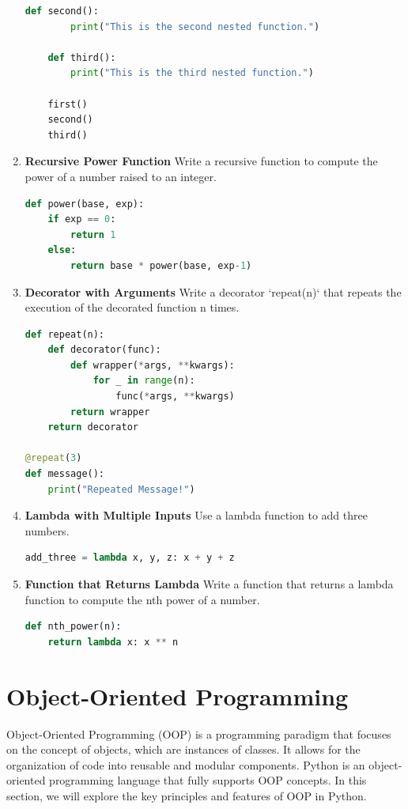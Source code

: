 \documentclass[12pt]{book}
\begin{document}
\begin{enumerate}
\begin{lstlisting}[language=Python]
    def second():
        print("This is the second nested function.")

    def third():
        print("This is the third nested function.")

    first()
    second()
    third()
\end{lstlisting}

\item \textbf{Recursive Power Function}
Write a recursive function to compute the power of a number raised to an integer.


\begin{lstlisting}[language=Python]
def power(base, exp):
    if exp == 0:
        return 1
    else:
        return base * power(base, exp-1)
\end{lstlisting}

\item \textbf{Decorator with Arguments}
Write a decorator `repeat(n)` that repeats the execution of the decorated function n times.


\begin{lstlisting}[language=Python]
def repeat(n):
    def decorator(func):
        def wrapper(*args, **kwargs):
            for _ in range(n):
                func(*args, **kwargs)
        return wrapper
    return decorator

@repeat(3)
def message():
    print("Repeated Message!")
\end{lstlisting}

\item \textbf{Lambda with Multiple Inputs}
Use a lambda function to add three numbers.


\begin{lstlisting}[language=Python]
add_three = lambda x, y, z: x + y + z
\end{lstlisting}

\item \textbf{Function that Returns Lambda}
Write a function that returns a lambda function to compute the nth power of a number.


\begin{lstlisting}[language=Python]
def nth_power(n):
    return lambda x: x ** n
\end{lstlisting}
\end{enumerate}


\newpage
\newpage
\chapter{Object-Oriented Programming}
Object-Oriented Programming (OOP) is a programming paradigm that focuses on the concept of objects, which are instances of classes. It allows for the organization of code into reusable and modular components. Python is an object-oriented programming language that fully supports OOP concepts. In this section, we will explore the key principles and features of OOP in Python.
\end{document}
